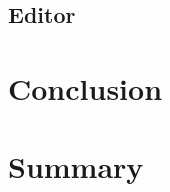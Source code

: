 \documentclass[twoside, openright, 12pt]{book}
\begin{document}
\section{Editor}
\label{evaluation_editor}


\cleardoublepage
\chapter{Conclusion}
\label{conclusion}
\blindtext



\cleardoublepage
\chapter{Summary}
\label{summary}
\blindtext







\cleardoublepage
\DeclareRobustCommand{\citeext}[1]{\citeauthor{#1}~\cite{#1}}




\end{document}
